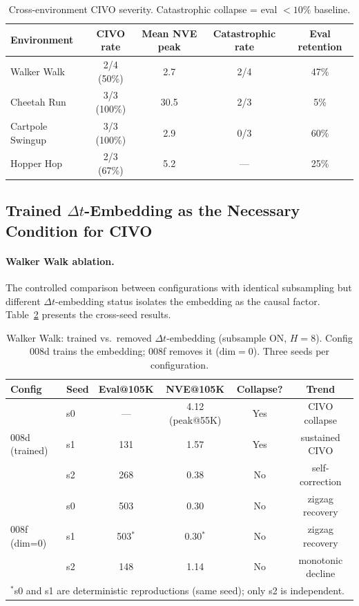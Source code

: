 \documentclass[10pt,letterpaper]{article}
\newcommand{\dt}{\Delta t}
\begin{document}
\begin{table}[h]
\centering
\caption{Cross-environment CIVO severity. Catastrophic collapse = eval $< 10\%$ baseline.}
\label{tab:civo_severity}
\begin{tabular}{lcccc}
\toprule
\textbf{Environment} & \textbf{CIVO rate} & \textbf{Mean NVE peak} & \textbf{Catastrophic rate} & \textbf{Eval retention} \\
\midrule
Walker Walk      & 2/4 (50\%)  & 2.7  & 2/4 & 47\% \\
Cheetah Run      & 3/3 (100\%) & 30.5 & 2/3 & 5\%  \\
Cartpole Swingup & 3/3 (100\%) & 2.9  & 0/3 & 60\% \\
Hopper Hop       & 2/3 (67\%)  & 5.2  & ---  & 25\% \\
\bottomrule
\end{tabular}
\end{table}

\subsection{Trained $\dt$-Embedding as the Necessary Condition for CIVO}
\label{sec:c2}

\paragraph{Walker Walk ablation.}
The controlled comparison between configurations with identical subsampling but different $\dt$-embedding status isolates the embedding as the causal factor. Table~\ref{tab:walker_ablation} presents the cross-seed results.

\begin{table}[h]
\centering
\caption{Walker Walk: trained vs.\ removed $\dt$-embedding (subsample ON, $H = 8$). Config 008d trains the embedding; 008f removes it ($\text{dim}=0$). Three seeds per configuration.}
\label{tab:walker_ablation}
\small
\begin{tabular}{llcccc}
\toprule
\textbf{Config} & \textbf{Seed} & \textbf{Eval@105K} & \textbf{NVE@105K} & \textbf{Collapse?} & \textbf{Trend} \\
\midrule
\multirow{3}{*}{008d (trained)} & s0 & --- & 4.12 (peak@55K) & Yes & CIVO collapse \\
                                & s1 & 131 & 1.57 & Yes & sustained CIVO \\
                                & s2 & 268 & 0.38 & No  & self-correction \\
\midrule
\multirow{3}{*}{008f (dim=0)}   & s0 & 503 & 0.30 & No  & zigzag recovery \\
                                & s1 & 503$^*$ & 0.30$^*$ & No  & zigzag recovery \\
                                & s2 & 148 & 1.14 & No  & monotonic decline \\
\bottomrule
\multicolumn{6}{l}{\footnotesize $^*$s0 and s1 are deterministic reproductions (same seed); only s2 is independent.}
\end{tabular}
\end{table}
\end{document}

